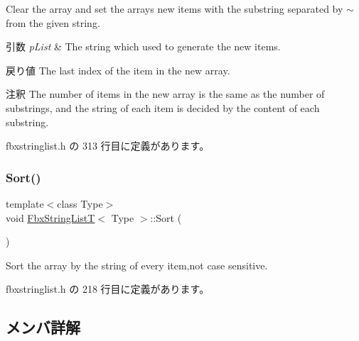 Clear the array and set the array\textquotesingle{}s new items with the substring separated by \textquotesingle{}$\sim$\textquotesingle{} from the given string. 
\begin{DoxyParams}{引数}
{\em p\+List} & The string which used to generate the new items. \\
\hline
\end{DoxyParams}
\begin{DoxyReturn}{戻り値}
The last index of the item in the new array. 
\end{DoxyReturn}
\begin{DoxyRemark}{注釈}
The number of items in the new array is the same as the number of substrings, and the string of each item is decided by the content of each substring. 
\end{DoxyRemark}


 fbxstringlist.\+h の 313 行目に定義があります。

\mbox{\label{class_fbx_string_list_t_a2fc06dea6d617b78af117cc4b8d97e3b}} 
\subsubsection{\texorpdfstring{Sort()}{Sort()}}
{\footnotesize\ttfamily template$<$class Type$>$ \\
void \hyperlink{class_fbx_string_list_t}{Fbx\+String\+ListT}$<$ Type $>$\+::Sort (\begin{DoxyParamCaption}{ }\end{DoxyParamCaption})\hspace{0.3cm}{\ttfamily [inline]}}



Sort the array by the string of every item,not case sensitive. 



 fbxstringlist.\+h の 218 行目に定義があります。



\subsection{メンバ詳解}
\mbox{\label{class_fbx_string_list_t_a4e123cd88e7d73c0ce3ff22cc5f6e2cc}} 
